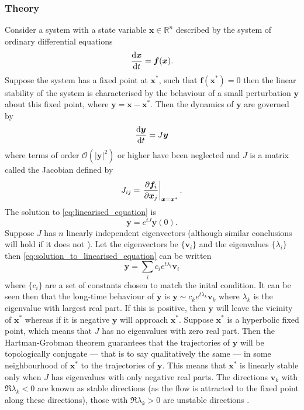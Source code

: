 \subsubsection{Theory}
Consider a system with a state variable $\bm{x} \in \mathbb{R}^n$ described by the system of ordinary  differential equations
\begin{equation}
  \label{eq:generic_system}
  \dv{\bm{x}}{t} = \bm{f}(\bm{x}).
\end{equation}
Suppose the system has a fixed point at $\bm{x}^*$, such that $\bm{f}(\bm{x}^*)=0$ then the linear stability of the system \parencite{Strogatz2015} is characterised by
the behaviour of a small perturbation $\bm{y}$ about this fixed point, where $\bm{y} = \bm{x} - \bm{x}^*$. Then the dynamics of $\bm{y}$ are governed by
\begin{equation}
  \label{eq:linearised_equation}
  \dv{\bm{y}}{t} = J\bm{y} 
\end{equation}
where terms of order $\mathcal{O}\left(\left|\bm{y}\right|^2\right)$ or higher have been neglected and $J$ is a matrix called the Jacobian defined by
\begin{equation}
  \label{eq:jacobian}
  J_{ij} = \eval{\pdv{\bm{f}_i}{\bm{x}_j}}_{\bm{x}=\bm{x}^*}.
\end{equation}
The solution to \cref{eq:linearised_equation} is
\begin{equation}
  \label{eq:solution_to_linearised_equation}
  \bm{y} = e^{tJ}\bm{y}(0).
\end{equation}
Suppose $J$ has $n$ linearly independent eigenvectors (although similar conclusions will hold if it does not \parencite{guckenheimer2013}).
Let the eigenvectors be $\{\bm{v}_i\}$ and the eigenvalues $\{\lambda_i\}$ then \cref{eq:solution_to_linearised_equation} can be written
\begin{equation}
  \label{eq:solution_to_linearised_equation_eigen}
  \bm{y} = \sum_i c_i e^{t\lambda_i}\bm{v}_i
\end{equation}
where $\{c_i\}$ are a set of constants chosen to match the inital condition. It can be seen then that the long-time behaviour of $\bm{y}$ is
$\bm{y} \sim c_k e^{t\lambda_k} \bm{v}_k$ where $\lambda_k$ is the eigenvalue with largest real part. If this is positive, then $\bm{y}$ will leave the vicinity of $\bm{x}^*$ whereas
if it is negative $\bm{y}$ will approach $\bm{x}^*$. Suppose $\bm{x}^*$ is a hyperbolic fixed point, which means that $J$ has no eigenvalues with zero real part. Then the Hartman-Grobman theorem
\parencite{Grobman1959,Hartman1960,Hartman1963} guarantees that the trajectories of $\bm{y}$ will be topologically conjugate --- that is to say qualitatively the same --- in some
neighbourhood of $\bm{x}^*$ to the trajectories of $\bm{y}$.  This means that $\bm{x}^*$ is linearly stable only when $J$ has eigenvalues with only negative real parts.
The directions $\bm{v}_k$ with $\Re \lambda_k < 0$ are known as stable directions (as the flow is attracted to the fixed point along these directions),
those with $\Re \lambda_k > 0$ are unstable directions \parencite{Strogatz2015}.

